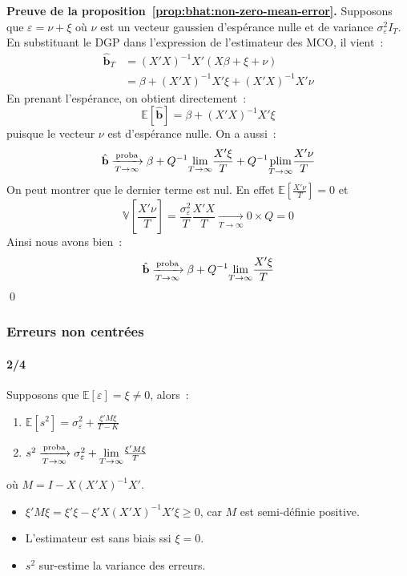 \documentclass[10pt]{beamer}
\begin{document}
\begin{notes}
  \textbf{Preuve de la proposition~\ref{prop:bhat:non-zero-mean-error}.} Supposons que $\varepsilon = \nu + \xi$ où $\nu$ est un vecteur gaussien d'espérance nulle et de variance $\sigma_{\varepsilon}^2I_T$. En substituant le DGP dans l'expression de l'estimateur des MCO, il vient~:
  \[
    \begin{split}
      \hat{\mathbf b}_T &= (X'X)^{-1}X'\left( X\beta + \xi + \nu\right)\\
      &= \beta + (X'X)^{-1}X'\xi + (X'X)^{-1}X'\nu
    \end{split}
  \]
  En prenant l'espérance, on obtient directement~:
  \[
    \mathbb E\left[ \hat{\mathbf b} \right] = \beta + (X'X)^{-1}X'\xi
  \]
  puisque le vecteur $\nu$ est d'espérance nulle. On a aussi~:
  \[
    \hat{\mathbf b} \xrightarrow[T\rightarrow\infty]{\text{proba}} \beta + Q^{-1}\underset{T\rightarrow\infty}{\lim}\frac{X'\xi}{T} + Q^{-1}\underset{T\rightarrow\infty}{\text{plim}}\frac{X'\nu}{T}
  \]
  On peut montrer que le dernier terme est nul. En effet $\mathbb E\left[\frac{X'\nu}{T}\right]=0$ et
  \[
    \mathbb V \left[ \frac{X'\nu}{T} \right] = \frac{\sigma_{\varepsilon}^2}{T}\frac{X'X}{T} \underset{T\rightarrow\infty}{\longrightarrow} 0\times Q = 0
  \]
  Ainsi nous avons bien~:
  \[
    \hat{\mathbf b} \xrightarrow[T\rightarrow\infty]{\text{proba}} \beta + Q^{-1}\underset{T\rightarrow\infty}{\lim}\frac{X'\xi}{T}
  \]
\qed
\end{notes}


\begin{frame}
  \frametitle{Erreurs non centrées}
  \framesubtitle{2/4}

  \begin{prop}\label{prop:s2:non-zero-mean-error}
    Supposons que $\mathbb E\left[\varepsilon\right] = \xi \neq 0$, alors~:
    \begin{enumerate}

    \item $\mathbb E\left[ s^2 \right] = \sigma_{\varepsilon}^2 + \frac{\xi'M\xi}{T-K}$
    \item $s^2 \xrightarrow[T\rightarrow\infty]{\text{proba}} \sigma_{\varepsilon}^2 + \underset{T\rightarrow\infty}{\lim} \frac{\xi'M\xi}{T}$

    \end{enumerate}
    où $M = I - X(X'X)^{-1}X'$.
  \end{prop}

  \bigskip

  \begin{itemize}

  \item  $\xi'M\xi = \xi'\xi - \xi'X(X'X)^{-1}X'\xi\geq 0$, car $M$ est semi-définie positive.\newline

  \item L'estimateur est sans biais ssi $\xi=0$.\newline

  \item $s^2$ sur-estime la variance des erreurs.

  \end{itemize}

\end{frame}
\end{document}
